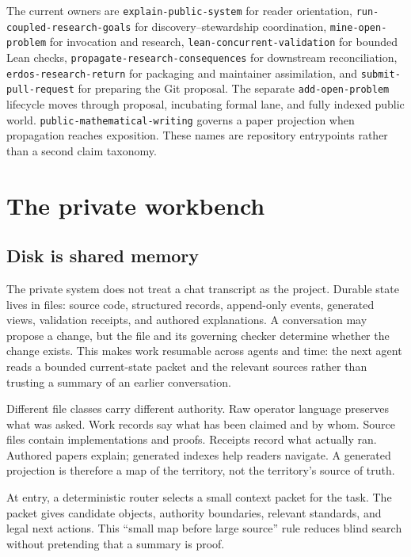 \documentclass[10pt]{article}
\begin{document}
The current owners are \texttt{explain-public-system} for reader orientation,
\texttt{run-coupled-research-goals} for discovery--stewardship coordination,
\texttt{mine-open-problem} for invocation and research,
\texttt{lean-concurrent-validation} for bounded Lean checks,
\texttt{propagate-research-consequences} for downstream reconciliation,
\texttt{erdos-research-return} for packaging and maintainer assimilation, and
\texttt{submit-pull-request} for preparing the Git proposal. The separate
\texttt{add-open-problem} lifecycle moves through proposal, incubating formal
lane, and fully indexed public world. \texttt{public-mathematical-writing}
governs a paper projection when propagation reaches exposition. These names
are repository entrypoints rather than a second claim taxonomy.

\section{The private workbench}\label{sec:private}

\subsection{Disk is shared memory}

The private system does not treat a chat transcript as the project. Durable
state lives in files: source code, structured records, append-only events,
generated views, validation receipts, and authored explanations. A conversation
may propose a change, but the file and its governing checker determine whether
the change exists. This makes work resumable across agents and time: the next
agent reads a bounded current-state packet and the relevant sources rather than
trusting a summary of an earlier conversation.

Different file classes carry different authority. Raw operator language
preserves what was asked. Work records say what has been claimed and by whom.
Source files contain implementations and proofs. Receipts record what actually
ran. Authored papers explain; generated indexes help readers navigate. A
generated projection is therefore a map of the territory, not the territory's
source of truth.

At entry, a deterministic router selects a small context packet for the task.
The packet gives candidate objects, authority boundaries, relevant standards,
and legal next actions. This ``small map before large source'' rule reduces
blind search without pretending that a summary is proof.
\end{document}
